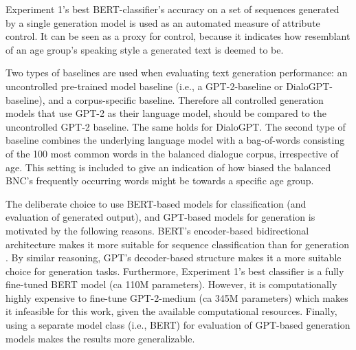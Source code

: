Experiment 1's best BERT-classifier's accuracy on a set of sequences generated by a single generation model is used as an automated measure of attribute control. It can be seen as a proxy for control, because it indicates how resemblant of an age group's speaking style a generated text is deemed to be.

Two types of baselines are used when evaluating text generation performance: an uncontrolled pre-trained model baseline (i.e., a GPT-2-baseline or DialoGPT-baseline), and a corpus-specific baseline. 
Therefore all controlled generation models that use GPT-2 as their language model, should be compared to the uncontrolled GPT-2 baseline. The same holds for DialoGPT. The second type of baseline combines the underlying language model with a bag-of-words consisting of the 100 most common words in the balanced dialogue corpus, irrespective of age. This setting is included to give an indication of how biased the balanced BNC's frequently occurring words might be towards a specific age group.

The deliberate choice to use BERT-based models for classification (and evaluation of generated output), and GPT-based models for generation is motivated by the following reasons. BERT's encoder-based bidirectional architecture makes it more suitable for sequence classification than for generation \citep{devlin-etal-2019-bert}. By similar reasoning, GPT's decoder-based structure makes it a more suitable choice for generation tasks. Furthermore, Experiment 1's best classifier is a fully fine-tuned BERT model (ca 110M parameters). However, it is computationally highly expensive to fine-tune GPT-2-medium (ca 345M parameters) which makes it infeasible for this work, given the available computational resources. Finally, using a separate model class (i.e., BERT) for evaluation of GPT-based generation models makes the results more generalizable.






